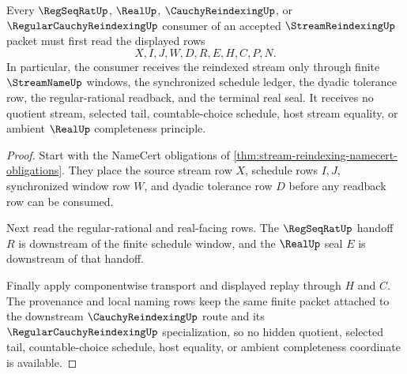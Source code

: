 \begin{theorem}
\label{thm:stream-reindexing-window-stability}
Every $\RegSeqRatUp$, $\RealUp$, $\CauchyReindexingUp$, or $\RegularCauchyReindexingUp$ consumer of an accepted $\StreamReindexingUp$ packet must first read the displayed rows
$$
X,I,J,W,D,R,E,H,C,P,N .
$$
In particular, the consumer receives the reindexed stream only through finite $\StreamNameUp$ windows, the synchronized schedule ledger, the dyadic tolerance row, the regular-rational readback, and the terminal real seal. It receives no quotient stream, selected tail, countable-choice schedule, host stream equality, or ambient $\RealUp$ completeness principle.
\end{theorem}
\begin{proof}
Start with the NameCert obligations of \autoref{thm:stream-reindexing-namecert-obligations}. They place the source stream row $X$, schedule rows $I,J$, synchronized window row $W$, and dyadic tolerance row $D$ before any readback row can be consumed.

Next read the regular-rational and real-facing rows. The $\RegSeqRatUp$ handoff $R$ is downstream of the finite schedule window, and the $\RealUp$ seal $E$ is downstream of that handoff.

Finally apply componentwise transport and displayed replay through $H$ and $C$. The provenance and local naming rows keep the same finite packet attached to the downstream $\CauchyReindexingUp$ route and its $\RegularCauchyReindexingUp$ specialization, so no hidden quotient, selected tail, countable-choice schedule, host equality, or ambient completeness coordinate is available.
\end{proof}




